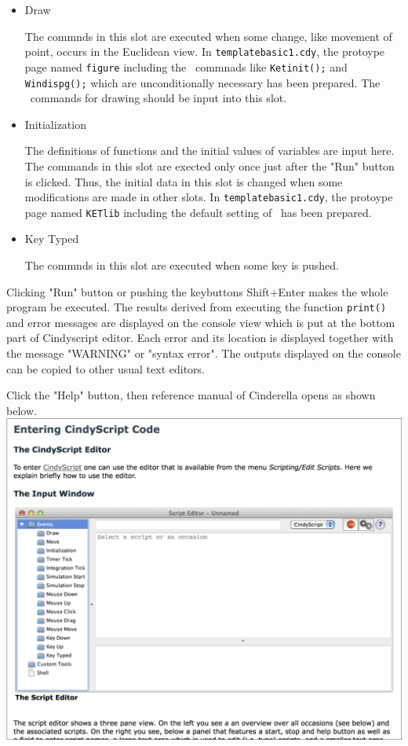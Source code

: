 \documentclass[papersize,a4paper,12pt]{article}
\begin{document}
\begin{itemize}

\item 
Draw

The commnds in this slot are executed 
when some change, like movement of point, 
occurs in the Euclidean view. 
In \verb|templatebasic1.cdy|, 
the protoype page named \verb|figure| 
including the \ketcindy\ commnads 
like \verb|Ketinit();| and \verb|Windispg();| 
which are unconditionally necessary 
has been prepared.  
The \ketcindy\ commands for drawing 
should be input into this slot. 

\item 
Initialization 

The definitions of functions 
and the initial values of variables 
are input here. 
The commands in this slot are exected 
only once just after the "Run" button is clicked. 
Thus, the initial data in this slot is changed 
when some modifications are made in other slots. 
In \verb|templatebasic1.cdy|, 
the protoype page named \verb|KETlib| 
including the default setting of \ketcindy\ 
has been prepared. 

\item 
Key Typed

The commnds in this slot are executed 
when some key is pushed. 

\end{itemize}

Clicking "Run" button or pushing the keybuttons Shift+Enter 
makes the whole program be executed. 
The results derived from executing the function \verb|print()| 
and error messages are displayed on the console view 
which is put at the bottom part of Cindyscript editor. 
Each error and its location 
is displayed together with the message 
"WARNING" or "syntax error". 
The outputs displayed on the console 
can be copied to other usual text editors. 

Click the "Help" button, 
then reference manual of Cinderella opens 
as shown below. \\

\includegraphics[bb=0.00 0.00 712.04 577.03,width=14cm]{Fig/CindyhelpE.pdf}
\end{document}
